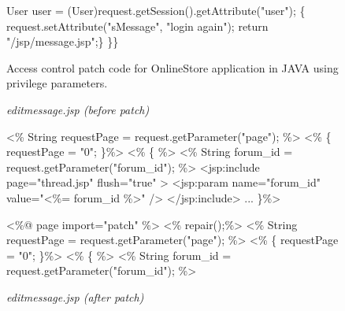\documentclass[10pt,journal,compsoc]{IEEEtran}
\begin{document}
\begin{CJK}{UTF8}{gbsn}
\begin{figure*}[h]
\begin{minipage}[t]{1\textwidth}
\begin{algorithm}[H]
\begin{algorithmic}[1]
\State User user = (User)request.getSession().getAttribute("user");
\{ 
    \State request.setAttribute("sMessage", "login again");
    \State return "/jsp/message.jsp";\}
\EndIf
\State \}\}
\end{algorithmic}
\end{algorithm}
\end{minipage}%
\caption{Access control patch code for OnlineStore application in JAVA using privilege parameters.}
\label{OnlineStore}
\end{figure*}

\begin{figure*}
\begin{minipage}[t]{0.48\textwidth}
\begin{algorithm}[H]
\small
\renewcommand{\thealgorithm}{}
\caption{\textit{editmessage.jsp (before patch)}}
\begin{algorithmic}[1]
\State \textless\% String requestPage = request.getParameter("page"); \%\textgreater 
\State \textless\%
\{
   \State requestPage = "0";
\State \}\%\textgreater 
\EndIf
\State \textless\%  
\{ \%\textgreater 
   \State \textless\% String forum\_id = request.getParameter("forum\_id"); \%\textgreater 
   \State \textless jsp:include page="thread.jsp" flush="true" \textgreater 
      \State \textless jsp:param name="forum\_id" value="\textless\%= forum\_id \%\textgreater " /\textgreater 
   \State \textless/jsp:include\textgreater 
\EndIf
\State ...
\State \}\%\textgreater 
\end{algorithmic}
\end{algorithm}
\end{minipage}
\hfill
\begin{minipage}[t]{0.48\textwidth}
\begin{algorithm}[H]
\small
\renewcommand{\thealgorithm}{}
\caption{\textit{editmessage.jsp (after patch)}}
\begin{algorithmic}[1]
\State \textcolor[rgb]{0.16,0.32,0.66}{\textless\%@ page import="patch" \%\textgreater }
\State \textcolor[rgb]{0.16,0.32,0.66}{\textless\% repair();\%\textgreater }
\State \textless\% String requestPage = request.getParameter("page"); \%\textgreater 
\State \textless\%
\{
   \State requestPage = "0";
\State \}\%\textgreater 
\EndIf
\State \textless\%  
\{ \%\textgreater 
   \State \textless\% String forum\_id = request.getParameter("forum\_id"); \%\textgreater 

\end{algorithmic}
\end{algorithm}
\end{minipage}
\end{figure*}
\end{CJK}
\end{document}
